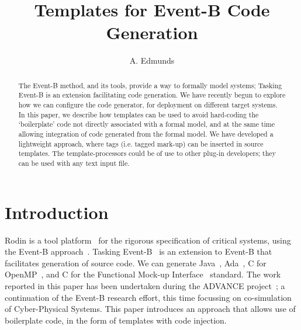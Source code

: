 \documentclass{llncs}%
\begin{document}
%
\title{Templates for Event-B Code Generation}

\author{A. Edmunds}


\maketitle
%
\begin{abstract}
The Event-B method, and  its tools, provide a way to formally model systems; Tasking Event-B is an extension facilitating code generation.  We have recently begun to explore how we can configure the code generator, for deployment on different target systems. In this paper, we describe how templates can be used to avoid hard-coding the `boilerplate' code not directly associated with a formal model, and at the same time allowing integration of code generated from the formal model. We have developed a lightweight approach, where tags (i.e. tagged mark-up) can be inserted in source templates. The template-processors could be of use to other plug-in developers; they can be used with any text input file. 
 \end{abstract}
%
%
\section{Introduction}
%
Rodin is a  tool platform~\cite{abrial10rodin} for the rigorous specification of critical systems, using the Event-B approach~\cite{ABR10}. Tasking Event-B~\cite{Edmunds2009,Edmunds2008,ae2011a,ae2012b} is an extension to Event-B that facilitates generation of source code. We can generate Java~\cite{JavaSpec}, Ada~\cite{ada2005}, C for OpenMP~\cite{openmp}, and C for the Functional Mock-up Interface~\cite{FMISTD} standard. The work reported in this paper has been undertaken during the ADVANCE project~\cite{advance}; a continuation of the Event-B research effort, this time focussing on co-simulation of Cyber-Physical Systems. This paper introduces an approach that allows use of boilerplate code, in the form of templates with code injection. 
\end{document}
